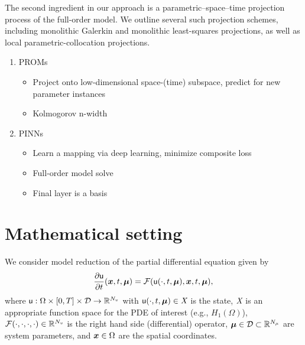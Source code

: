 \documentclass[3p,computermodern,10pt]{elsarticle}
\begin{document}
The second ingredient in our approach is a parametric--space--time projection process of the full-order model. We outline several such projection schemes, including monolithic Galerkin and monolithic least-squares projections, as well as local parametric-collocation projections.  
  
\begin{enumerate}
\item PROMs
\begin{itemize}
\item Project onto low-dimensional space-(time) subspace, predict for new parameter instances
\item Kolmogorov n-width
\end{itemize}
\item PINNs
\begin{itemize}
\item Learn a mapping via deep learning, minimize composite loss
\item Full-order model solve
\item Final layer is a basis
\end{itemize}
\end{enumerate}  
\section{Mathematical setting}
We consider model reduction of the partial differential equation given by
\begin{equation}\label{eq:fom}
\frac{\partial \mathsf{u}}{\partial t}(\boldsymbol x, t,\boldsymbol \mu) = \mathcal{F}(\mathsf{u}(\cdot,t,\boldsymbol \mu),\boldsymbol x, t,\boldsymbol \mu), 
\end{equation}
where $\mathsf{u}: \Omega \times [0,T] \times \mathcal{D} \rightarrow \mathbb{R}^{N_v}$ with $\mathsf{u}(\cdot,t,\boldsymbol \mu) \in \textit{X}$ is the state, $\textit{X}$ is an appropriate function space for the PDE of interest (e.g., $H_1(\Omega)$), $\mathcal{F}(\cdot,\cdot,\cdot,\cdot) \in \mathbb{R}^{N_v}$ is the right hand side (differential) operator, $\boldsymbol \mu \in \mathcal{D} \subset \mathbb{R}^{N_{\mu}}$  are system parameters, and $\boldsymbol x \in \Omega$ are the spatial coordinates.
\end{document}
